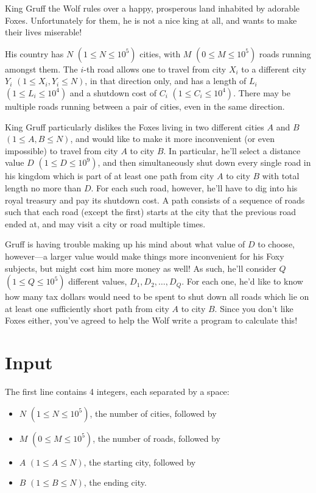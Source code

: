 King Gruff the Wolf rules over a happy, prosperous land inhabited by adorable Foxes. Unfortunately for them, he is not a nice king at all, and wants to make their lives miserable!

His country has $N$ $(1 \leq N \leq 10^5)$ cities, with $M$ $(0 \leq M \leq 10^5)$ roads running
amongst them. The $i$-th road allows one to travel from city $X_i$ to a different city $Y_i$ $(1 \leq
X_i,Y_i \leq N)$, in that direction only, and has a length of $L_i$ $(1 \leq L_i \leq 10^4)$ and a
shutdown cost of $C_i$ $(1 \leq C_i \leq 10^4)$. There may be multiple roads running between a pair
of cities, even in the same direction.

King Gruff particularly dislikes the Foxes living in two different cities $A$ and $B$ $(1 \leq A,B
\leq N)$, and would like to make it more inconvenient (or even impossible) to travel from city $A$
to city $B$. In particular, he'll select a distance value $D$ $(1 \leq D \leq 10^9)$, and then
simultaneously shut down every single road in his kingdom which is part of at least one path from
city $A$ to city $B$ with total length no more than $D$. For each such road, however, he'll have to
dig into his royal treasury and pay its shutdown cost. A path consists of a sequence of roads such
that each road (except the first) starts at the city that the previous road ended at, and may visit
a city or road multiple times.

Gruff is having trouble making up his mind about what value of $D$ to choose, however---a larger
value would make things more inconvenient for his Foxy subjects, but might cost him more money as
well! As such, he'll consider $Q$ $(1 \leq Q \leq 10^5)$ different values, $D_1, D_2, \ldots, D_Q$.
For each one, he'd like to know how many tax dollars would need to be spent to shut down all roads
which lie on at least one sufficiently short path from city $A$ to city $B$. Since you don't like
Foxes either, you've agreed to help the Wolf write a program to calculate this!

\section*{Input}
The first line contains 4 integers, each separated by a space:

\begin{itemize}
\item $N$ $(1 \leq N \leq 10^5)$, the number of cities, followed by
\item $M$ $(0 \leq M \leq 10^5)$, the number of roads, followed by
\item $A$ $(1 \leq A \leq N)$, the starting city, followed by
\item $B$ $(1 \leq B \leq N)$, the ending city.
\end{itemize}

